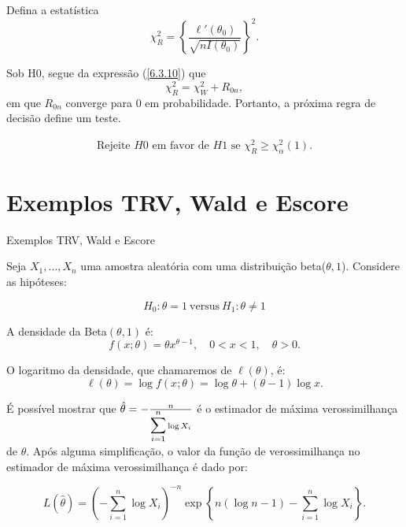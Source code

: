 \documentclass[12pt]{beamer}
\begin{document}
\begin{frame}{}
\begin{block}{}
\justifying
Defina a estatística
\[
\chi^2_R = \left\{\frac{\ell'(\theta_{0})}{\sqrt{nI(\theta_0)}}\right\}^2. 
\]

Sob H0, segue da expressão (\ref{6.3.10}) que
\[
\chi^2_R = \chi^2_W + R_{0n},
\]
em que $R_{0n}$ converge para $0$ em probabilidade. Portanto, a próxima regra de decisão define um teste.
\end{block}
\pause
\begin{block}{}
\justifying
\begin{align}\label{6.3.20}
    \text{Rejeite } H0 \text{ em favor de } H1 \text{ se } \chi^2_R \geq \chi^2_\alpha(1).
\end{align}
\end{block}
\end{frame}

\section{Exemplos TRV, Wald e Escore}
\begin{frame}{Exemplos TRV, Wald e Escore}
\begin{block}{}
\justifying
Seja \(X_1, \ldots, X_n\) uma amostra aleatória com uma distribuição beta(\(\theta, 1\)). Considere as hipóteses: 

$$H_0: \theta = 1~ \text{versus}~ H_1: \theta \neq 1$$
\end{block}
\pause

\begin{block}{}
A densidade da Beta\((\theta, 1)\) é:
\[
f(x; \theta) = \theta x^{\theta - 1}, \quad 0 < x < 1, \quad \theta > 0.
\]

O logaritmo da densidade, que chamaremos de \(\ell(\theta)\), é:
\[
\ell(\theta) = \log f(x; \theta) = \log \theta + (\theta - 1) \log x.
\]

\end{block}
\end{frame}

\begin{frame}
\begin{block}{}
	\justifying
	É possível mostrar que \(\hat{\theta} = -\frac{n}{{\displaystyle \sum_{i=1}^{n}} \log X_i}\) é o estimador de máxima verossimilhança de \(\theta\). Após alguma simplificação, o valor da função de verossimilhança no estimador de máxima verossimilhança é dado por:
	
	\[L(\hat{\theta}) = \left(- \sum_{i=1}^n \log X_i\right)^{-n}\exp\left\{n(\log n - 1) - \sum_{i=1}^n \log X_i\right\}.\] 
\end{block}
\end{frame}
\end{document}
